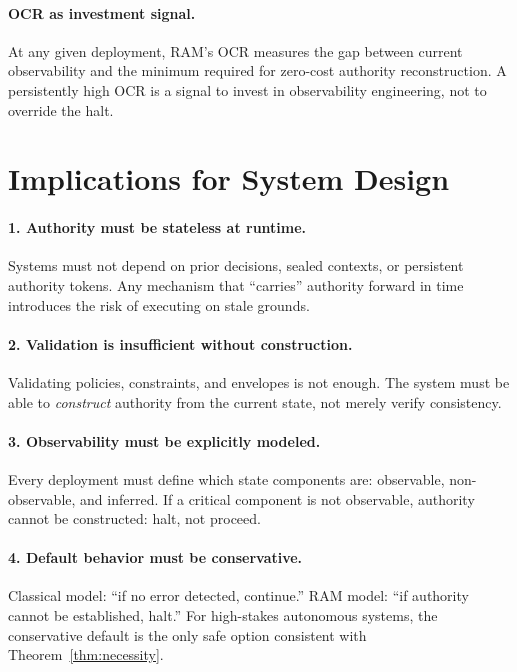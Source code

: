 \documentclass[11pt]{article}
\begin{document}
\paragraph{OCR as investment signal.}
At any given deployment, RAM's OCR measures the gap between current
observability and the minimum required for zero-cost authority reconstruction.
A persistently high OCR is a signal to invest in observability engineering,
not to override the halt.

\section{Implications for System Design}
\label{sec:design}

\paragraph{1. Authority must be stateless at runtime.}
Systems must not depend on prior decisions, sealed contexts, or persistent
authority tokens.
Any mechanism that ``carries'' authority forward in time introduces the risk
of executing on stale grounds.

\paragraph{2. Validation is insufficient without construction.}
Validating policies, constraints, and envelopes is not enough.
The system must be able to \emph{construct} authority from the current state,
not merely verify consistency.

\paragraph{3. Observability must be explicitly modeled.}
Every deployment must define which state components are:
observable, non-observable, and inferred.
If a critical component is not observable, authority cannot be constructed:
halt, not proceed.

\paragraph{4. Default behavior must be conservative.}
Classical model: ``if no error detected, continue.''
RAM model: ``if authority cannot be established, halt.''
For high-stakes autonomous systems, the conservative default is the only
safe option consistent with Theorem~\ref{thm:necessity}.
\end{document}
